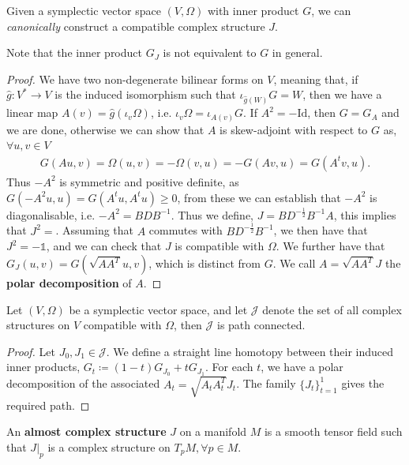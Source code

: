 \documentclass[11pt, final]{article}
\begin{document}
\begin{prop}
	Given a symplectic vector space $(V,\Omega)$ with inner product $G$, we can \textit{canonically} construct a compatible complex structure $J$.
\end{prop}
\begin{remark}
	Note that the inner product $G_J$ is not equivalent to $G$ in general.
\end{remark}

\begin{proof}
	We have two non-degenerate bilinear forms on $V$, meaning that, if $\hat{g}: V^* \to V$ is the induced isomorphism such that $\iota_{\hat{g}(W)}G = W$, then we have a linear map ${A(v) = \hat{g}(\iota_v \Omega)}$, i.e. $\iota_v \Omega = \iota_{A(v)} G$. If $A^2 = - \mathrm{Id}$, then $G = G_A$ and we are done, otherwise we can show that $A$ is skew-adjoint with respect to $G$ as, $\forall u,v \in V$
		\begin{align}
			G(Au,v) = \Omega(u,v) = -\Omega(v,u) = - G(Av,u) = G(A^tv,u).
		\end{align}
	Thus $-A^2$ is symmetric and positive definite, as $G(-A^2u,u) = G(A^tu,A^tu) \geq 0$, from these we can establish that $-A^2$ is diagonalisable, i.e. $-A^2 = BDB^{-1}$. Thus we define, $J = B D^{-\tfrac{1}{2}} B^{-1} A$, this implies that $J^2 = $. Assuming that $A$ commutes with $BD^{-\tfrac{1}{2}}B^{-1}$, we then have that $J^2 = -\mathds{1}$, and we can check that $J$ is compatible with $\Omega$. We further have that $G_J(u,v) = G(\sqrt{AA^T}u,v)$, which is distinct from $G$. We call $A = \sqrt{AA^T}J$ the \textbf{polar decomposition} of $A$.
\end{proof}

\begin{prop}
	Let $(V,\Omega)$ be a symplectic vector space, and let $\mathcal{J}$ denote the set of all complex structures on $V$ compatible with $\Omega$, then $\mathcal{J}$ is path connected.
\end{prop}
\begin{proof}
	Let $J_0, J_1 \in \mathcal{J}$. We define a straight line homotopy between their induced inner products, $G_t \coloneqq (1-t) G_{J_0} + t G_{J_1}$. For each $t$, we have a polar decomposition of the associated $A_t = \sqrt{A_t A_t^T}J_t$. The family $\{J_t\}_{t=1}^1$ gives the required path.
\end{proof}

\begin{definition}
	An \textbf{almost complex structure} $J$ on a manifold $M$ is a smooth tensor field such that $J|_p$ is a complex structure on $T_pM, \forall p \in M$.
\end{definition}
\end{document}

